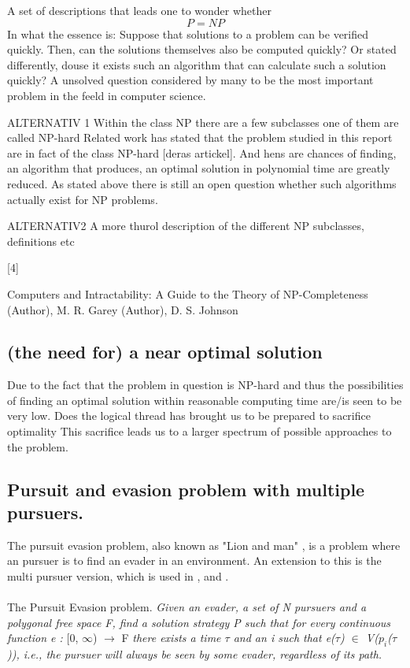 A set of descriptions that leads one to wonder whether
\begin{equation}
P = NP
\end{equation}
In what the essence is:
Suppose that solutions to a problem can be verified quickly. Then, can the solutions themselves also be computed quickly?
Or stated differently, douse it exists such an algorithm that can calculate such a solution quickly?
A unsolved question considered by many to be the most important problem in the feeld in computer science. 

ALTERNATIV 1
Within the class NP there are a few subclasses one of them are called NP-hard 
Related work has stated that the problem studied in this report are in fact of the class NP-hard [deras artickel].  And hens are chances of finding, an algorithm that produces, an optimal solution in polynomial time are greatly reduced. As stated above there is still an open question whether such algorithms actually exist for NP problems. 

ALTERNATIV2
A more thurol description of the different NP subclasses, definitions etc

[4]

Computers and Intractability: A Guide to the Theory of NP-Completeness  (Author),  M. R. Garey (Author), D. S. Johnson

\subsection{(the need for) a near optimal solution}

Due to the fact that the problem in question is NP-hard and thus the possibilities of finding an optimal solution within reasonable computing time are/is seen to be very low. Does the logical thread has brought us to be prepared to sacrifice optimality
This sacrifice leads us to a larger spectrum of possible approaches to the problem.


 \subsection {Pursuit and evasion problem with multiple pursuers.}
The pursuit evasion problem, also known as "Lion and man" \cite{Dumitrescu08}, is a problem where an pursuer is to find an evader in an environment. An extension to this is the multi pursuer version, which is used in \cite{paper1},\cite{paper2} and \cite{paper3}.\\
\\
The Pursuit Evasion problem. \emph{Given an evader, a set of N pursuers and a polygonal free space F, find a solution strategy P such that for every continuous function e : }[0, $\infty$) $\rightarrow$ F \emph{there exists a time $\tau$ and an i such that e($\tau$) $\in$ V($p_i$($\tau$)), i.e., the pursuer will always be seen by some evader, regardless of its path.}\cite{paper1}


